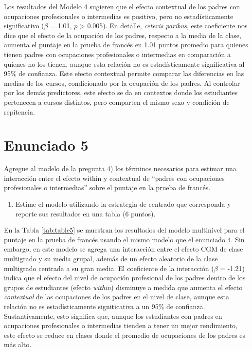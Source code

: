 \documentclass[
  12pt,
  a4paper,
]{article}
\providecommand{\tightlist}{%
  \setlength{\itemsep}{0pt}\setlength{\parskip}{0pt}}
\begin{document}
Los resultados del Modelo 4 sugieren que el efecto contextual de los padres con ocupaciones profesionales o intermedias es positivo, pero no estadísticamente significativo (\(\beta\) = 1.01, \(p\) \textgreater{} 0.005). En detalle, \emph{ceteris paribus}, este coeficiente nos dice que el efecto de la ocupación de los padres, respecto a la media de la clase, aumenta el puntaje en la prueba de francés en 1.01 puntos promedio para quienes tienen padres con ocupaciones profesionales o intermedias en comparación a quienes no los tienen, aunque esta relación no es estadísticamente significativa al 95\% de confianza. Este efecto contextual permite comparar las diferencias en las medias de los cursos, condicionado por la ocupación de los padres. Al controlar por los demás predictores, este efecto se da en contextos donde los estudiantes pertenecen a cursos distintos, pero comparten el mismo sexo y condición de repitencia.

\hypertarget{enunciado-5}{%
\section{Enunciado 5}\label{enunciado-5}}

Agregue al modelo de la pregunta 4) los términos necesarios para estimar una interacción entre el efecto within y contextual de ``padres con ocupaciones profesionales o intermedias'' sobre el puntaje en la prueba de francés.

\begin{enumerate}
\def\labelenumi{\alph{enumi})}
\tightlist
\item
  Estime el modelo utilizando la estrategia de centrado que corresponda y reporte sus resultados en una tabla (6 puntos).
\end{enumerate}

En la Tabla \ref{tab:table5} se muestran los resultados del modelo multinivel para el puntaje en la prueba de francés usando el mismo modelo que el enunciado 4. Sin embargo, en este modelo se agrega una interacción entre el efecto CGM de clase multigrado y su media grupal, además de un efecto aleatorio de la clase multigrado centrada a su gran media. El coeficiente de la interacción (\(\beta\) = -1.21) indica que el efecto del nivel de ocupación profesional de los padres dentro de los grupos de estudiantes (efecto \emph{within}) disminuye a medida que aumenta el efecto \emph{contextual} de las ocupaciones de los padres en el nivel de clase, aunque esta relación no es estadísticamente signiticativa a un 95\% de confianza. Sustantivamente, esto significa que, aunque los estudiantes con padres en ocupaciones profesionales o intermedias tienden a tener un mejor rendimiento, este efecto se reduce en clases donde el promedio de ocupaciones de los padres es más alto.
\end{document}
